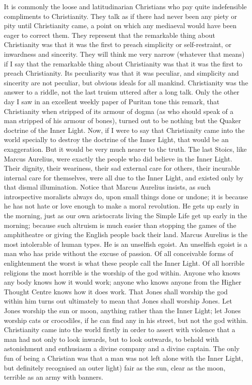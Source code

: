 \documentclass{book}
\begin{document}
It is commonly the loose and latitudinarian Christians who pay quite indefensible compliments to Christianity. They talk as if there had never been any piety or pity until Christianity came, a point on which any mediaeval would have been eager to correct them. They represent that the remarkable thing about Christianity was that it was the first to preach simplicity or self-restraint, or inwardness and sincerity. They will think me very narrow (whatever that means) if I say that the remarkable thing about Christianity was that it was the first to preach Christianity. Its peculiarity was that it was peculiar, and simplicity and sincerity are not peculiar, but obvious ideals for all mankind. Christianity was the answer to a riddle, not the last truism uttered after a long talk. Only the other day I saw in an excellent weekly paper of Puritan tone this remark, that Christianity when stripped of its armour of dogma (as who should speak of a man stripped of his armour of bones), turned out to be nothing but the Quaker doctrine of the Inner Light. Now, if I were to say that Christianity came into the world specially to destroy the doctrine of the Inner Light, that would be an exaggeration. But it would be very much nearer to thc truth. The last Stoics, like Marcus Aurelius, were exactly the people who did believe in the Inner Light. Their dignity, their weariness, their sad external care for others, their incurable internal care for themselves, were all due to the Inner Light, and existed only by that dismal illumination. Notice that Marcus Aurelius insists, as such introspective moralists always do, upon small things done or undone; it is because he has not hate or love enough to make a moral revolution. He gets up early in the morning, just as our own aristocrats living the Simple Life get up early in the morning; because such altruism is much easier than stopping the games of the amphitheatre or giving the English people back their land. Marcus Aurelius is the most intolerable of human types. He is an unselfish egoist. An unselfish egoist is a man who has pride without the excuse of passion. Of all conceivable forms of enlightenment the worst is what these people call the Inner Light. Of all horrible religions the most horrible is the worship of the god within. Anyone who knows any body knows how it would work; anyone who knows anyone from the Higher Thought Centre knows how it does work. That Jones shall worship the god within him turns out ultimately to mean that Jones shall worship Jones. Let Jones worship the sun or moon, anything rather than the Inner Light; let Jones worship cats or crocodiles, if he can find any in his street, but not the god within. Christianity came into the world firstly in order to assert with violence that a man had not only to look inwards, but to look outwards, to behold with astonishment and enthusiasm a divine company and a divine captain. The only fun of being a Christian was that a man was not left alone with the Inner Light, but definitely recognised an outer light) fair as the sun, clear as the moon, terrible as an army with banners.
\end{document}
